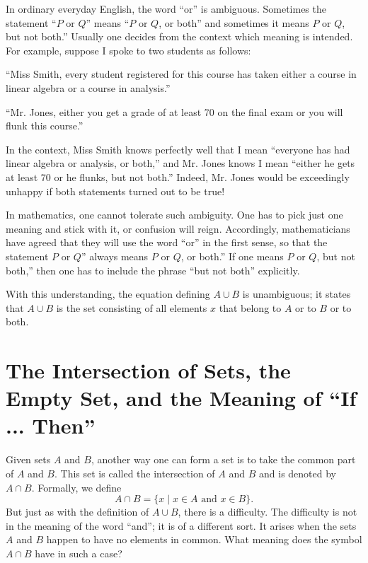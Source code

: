 In ordinary everyday English, the word ``or'' is ambiguous. Sometimes the statement 
``\(P\) or \(Q\)'' means ``\(P\) or \(Q\), or both'' and sometimes it means 
\(P\) or \(Q\), but not both.'' Usually one decides from the context which meaning 
is intended. For example, suppose I spoke to two students as follows:

\begin{centeredblock}
 ``Miss Smith, every student registered for this course has taken either a course in linear algebra or a course in analysis.''

 ``Mr. Jones, either you get a grade of at least 70 on the final exam or you will flunk this course.''
\end{centeredblock}
In the context, Miss Smith knows perfectly well that I mean 
``everyone has had linear algebra or analysis, or both,'' 
and Mr. Jones knows I mean ``either he gets at least 70 or he flunks, but not both.'' 
Indeed, Mr. Jones would be exceedingly unhappy if both statements turned out to be true!

In mathematics, one cannot tolerate such ambiguity. One has to pick just one meaning and stick with it, 
or confusion will reign. Accordingly, mathematicians have agreed that they will use the word ``or'' 
in the first sense, so that the statement \(P\) or \(Q\)'' always means \(P\) or \(Q\), or both.'' 
If one means \(P\) or \(Q\), but not both,'' then one has to include the phrase ``but not both'' explicitly.

With this understanding, the equation defining \(A \cup B\) is unambiguous; 
it states that \(A \cup B\) is the set consisting of all elements \(x\) 
that belong to \(A\) or to \(B\) or to both.

\section*{The Intersection of Sets, the Empty Set, and the Meaning of ``If ... Then''}

Given sets \(A\) and \(B\), another way one can form a set is to take the common part of \(A\) and \(B\). 
This set is called the intersection of \(A\) and \(B\) and is denoted by \(A \cap B\). 
Formally, we define
\[
A \cap B = \{ x \mid x \in A\text{ and }x \in B\}.
\]
But just as with the definition of \(A \cup B\), there is a difficulty. 
The difficulty is not in the meaning of the word ``and''; it is of a different sort. 
It arises when the sets \(A\) and \(B\) happen to have no elements in common. 
What meaning does the symbol \(A \cap B\) have in such a case?


